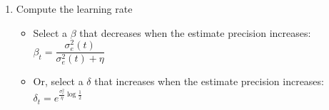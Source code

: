 \documentclass[portrait,a0paper,fontscale=0.312]{baposter}
\begin{document}
\begin{poster}
{\begin{minipage}[t]{.47\textwidth}
\begin{enumerate}
   \item Compute the learning rate
      \begin{itemize}
	\item Select a $\beta$ that decreases when the estimate precision increases:\\
	$\beta_t=\dfrac{\sigma_e^2(t)}{\sigma_e^2(t)+\eta}$
	\item Or, select a $\delta$ that increases when the estimate precision increases: \\
	$\delta_t=e^{\frac{\sigma_e^2}{\eta}\log\frac{1}{2}}$
      \end{itemize}
  \end{enumerate}

\end{minipage}
\hfill
}

\headerbox{Empirical Results}{name=emp,column=0,row=3,span=6,below=rq}{

}
\end{poster}
\end{document}
